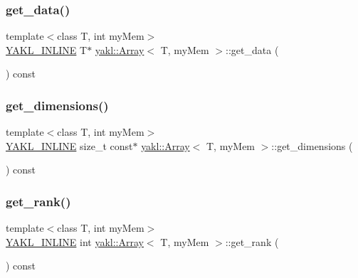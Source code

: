 \mbox{\label{classyakl_1_1Array_ab085c126b12e617a5038f6675b729988}} 
\subsubsection{\texorpdfstring{get\+\_\+data()}{get\_data()}}
{\footnotesize\ttfamily template$<$class T, int my\+Mem$>$ \\
\hyperlink{YAKL_8h_aa0dd629ffce6d564b19e9313fb91a5ad}{Y\+A\+K\+L\+\_\+\+I\+N\+L\+I\+NE} T$\ast$ \hyperlink{classyakl_1_1Array}{yakl\+::\+Array}$<$ T, my\+Mem $>$\+::get\+\_\+data (\begin{DoxyParamCaption}{ }\end{DoxyParamCaption}) const\hspace{0.3cm}{\ttfamily [inline]}}

\mbox{\label{classyakl_1_1Array_a337ee69b396e35e897b9a9b6ef8cefcd}} 
\subsubsection{\texorpdfstring{get\+\_\+dimensions()}{get\_dimensions()}}
{\footnotesize\ttfamily template$<$class T, int my\+Mem$>$ \\
\hyperlink{YAKL_8h_aa0dd629ffce6d564b19e9313fb91a5ad}{Y\+A\+K\+L\+\_\+\+I\+N\+L\+I\+NE} size\+\_\+t const$\ast$ \hyperlink{classyakl_1_1Array}{yakl\+::\+Array}$<$ T, my\+Mem $>$\+::get\+\_\+dimensions (\begin{DoxyParamCaption}{ }\end{DoxyParamCaption}) const\hspace{0.3cm}{\ttfamily [inline]}}

\mbox{\label{classyakl_1_1Array_a71a7973125942ecf4c15f10de27a4f08}} 
\subsubsection{\texorpdfstring{get\+\_\+rank()}{get\_rank()}}
{\footnotesize\ttfamily template$<$class T, int my\+Mem$>$ \\
\hyperlink{YAKL_8h_aa0dd629ffce6d564b19e9313fb91a5ad}{Y\+A\+K\+L\+\_\+\+I\+N\+L\+I\+NE} int \hyperlink{classyakl_1_1Array}{yakl\+::\+Array}$<$ T, my\+Mem $>$\+::get\+\_\+rank (\begin{DoxyParamCaption}{ }\end{DoxyParamCaption}) const\hspace{0.3cm}{\ttfamily [inline]}}

